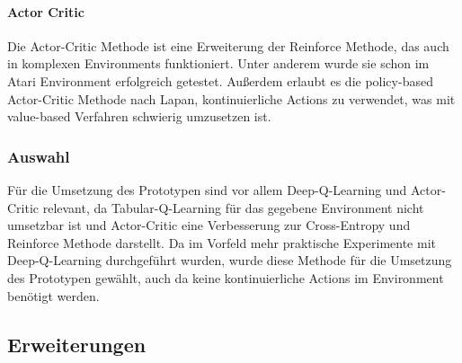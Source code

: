 \documentclass[11pt]{scrartcl}
\begin{document}
\paragraph{Actor Critic}
Die Actor-Critic Methode ist eine Erweiterung der Reinforce Methode, das auch in komplexen
Environments funktioniert. Unter anderem wurde sie schon im Atari Environment erfolgreich
getestet. Außerdem erlaubt es die policy-based Actor-Critic Methode nach Lapan,
kontinuierliche Actions zu verwendet, was \cite[~S.346]{L2018} mit value-based Verfahren
schwierig umzusetzen ist.

\subsubsection{Auswahl}
Für die Umsetzung des Prototypen sind vor allem Deep-Q-Learning und Actor-Critic relevant,
da Tabular-Q-Learning für das gegebene Environment nicht umsetzbar ist und Actor-Critic
eine Verbesserung zur Cross-Entropy und Reinforce Methode darstellt. Da im Vorfeld mehr
praktische Experimente mit Deep-Q-Learning durchgeführt wurden, wurde diese Methode für
die Umsetzung des Prototypen gewählt, auch da keine kontinuierliche Actions im Environment
benötigt werden.


\subsection{Erweiterungen}
\end{document}
